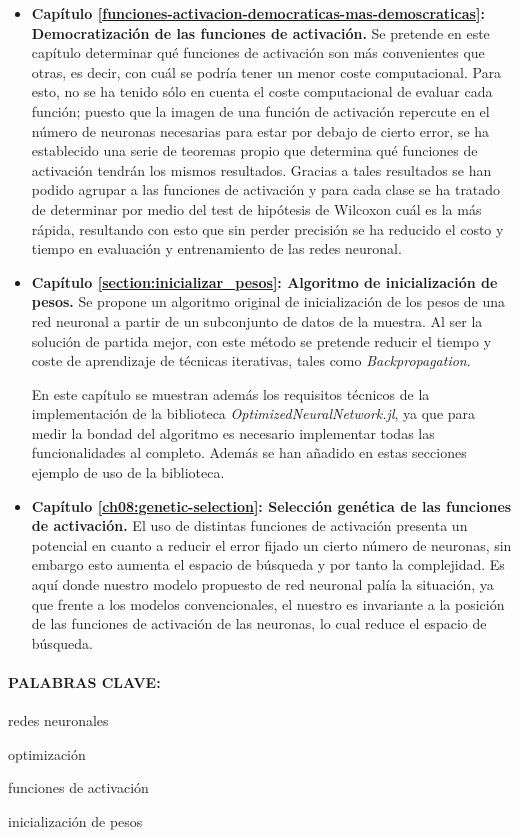 \begin{itemize}
    \item \textbf{Capítulo \ref{funciones-activacion-democraticas-mas-demoscraticas}: Democratización de las funciones de activación.} Se pretende en este capítulo determinar qué funciones de activación son más convenientes que otras, es decir, con cuál se podría tener un menor coste computacional. 
    Para esto, no se ha tenido sólo en cuenta el coste computacional de evaluar cada función; puesto que la imagen de una función de activación repercute 
    en el número de neuronas necesarias para estar por debajo de cierto error, se ha establecido una serie de teoremas propio que determina qué funciones de activación tendrán los mismos resultados.  Gracias a tales resultados se han 
    podido agrupar a las funciones de activación y 
    para cada clase se ha tratado de determinar por medio del test de hipótesis de Wilcoxon cuál es la más rápida, resultando con esto que sin perder precisión se ha reducido el costo y tiempo en evaluación y entrenamiento de las redes neuronal. 
    
    \item \textbf{Capítulo \ref{section:inicializar_pesos}: Algoritmo de inicialización de pesos.} Se propone un algoritmo original de inicialización de los pesos de una red neuronal a 
    partir de un subconjunto de datos de la muestra. Al ser la solución de partida mejor, con este método se pretende reducir el tiempo y coste de aprendizaje de técnicas iterativas, tales como \textit{Backpropagation}.  
    
    En este capítulo se muestran además los 
    requisitos técnicos de la implementación de la biblioteca \textit{OptimizedNeuralNetwork.jl}, 
    ya que para medir la bondad del algoritmo es 
    necesario implementar todas las funcionalidades al completo. Además se han añadido en estas 
    secciones ejemplo de uso de la biblioteca. 
    \item \textbf{Capítulo \ref{ch08:genetic-selection}: Selección genética de las funciones de activación.} El uso de distintas funciones de activación presenta un 
    potencial en cuanto a reducir el error fijado un cierto número de neuronas, sin embargo esto 
    aumenta el espacio de búsqueda y por tanto la complejidad. Es aquí donde nuestro modelo 
    propuesto de red neuronal palía la situación, 
    ya que frente a los modelos convencionales, el nuestro es invariante a la posición de las 
    funciones de activación de las neuronas, lo cual
     reduce el espacio de búsqueda.  
\end{itemize}

\paragraph{PALABRAS CLAVE:}
\begin{itemize*}[label=,itemsep=1em,itemjoin=\hspace{1em}]
  \item redes neuronales
  \item optimización 
  \item funciones de activación 
  \item inicialización de pesos
\end{itemize*}

\endinput

